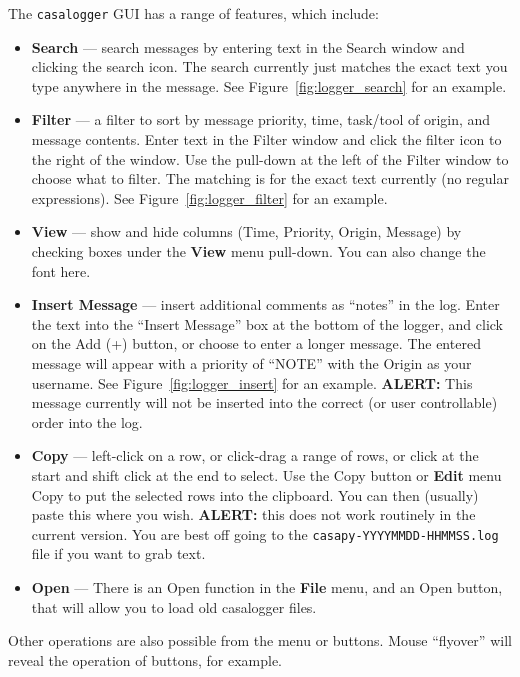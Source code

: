 The {\tt casalogger} GUI has a range of features, which include:
\begin{itemize}
\item {\bf Search} --- search messages by entering text in the Search
window and clicking the search icon.  The search currently just
matches the exact text you type anywhere in the message.  See 
Figure~\ref{fig:logger_search} for an example.

\item {\bf Filter} --- a filter to sort by message priority, time,
task/tool of origin, and message contents.  Enter text in the
Filter window and click the filter icon to the right of the window.
Use the pull-down at the left of the Filter window to choose what
to filter.  The matching is for the exact text currently (no regular
expressions).  See 
Figure~\ref{fig:logger_filter} for an example.

\item {\bf View} --- show and hide columns (Time, Priority, Origin,
Message) by checking boxes under the {\bf View} menu pull-down.  You
can also change the font here.

\item {\bf Insert Message} --- insert additional comments as ``notes''
in the log.  Enter the text into the ``Insert Message'' box at the
bottom of the logger, and click on the Add (+) button, or choose to
enter a longer message.  The entered message will appear with a
priority of ``NOTE'' with the Origin as your username.  See
Figure~\ref{fig:logger_insert} for an example. {\bf ALERT:} This
message currently will not be inserted into the correct (or user
controllable) order into the log.

\item {\bf Copy} --- left-click on a row, or click-drag a
range of rows, or click at the start and shift click at the end to
select.  Use the Copy button or {\bf Edit} menu Copy to put the
selected rows into the clipboard.  You can then (usually) paste this
where you wish.  {\bf ALERT:} this does not work routinely in the
current version.  You are best off going to the {\tt casapy-YYYYMMDD-HHMMSS.log} file
if you want to grab text.

\item {\bf Open} --- There is an Open function in the
{\bf File} menu, and an Open button, that will allow you to load old
casalogger files. 

\end{itemize}

Other operations are also possible from the menu or buttons.  Mouse
``flyover'' will reveal the operation of buttons, for example.

